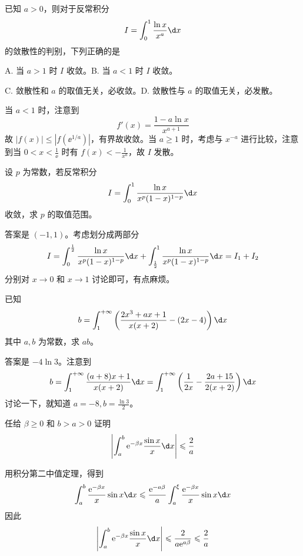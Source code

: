 \begin{problem}[000027]
已知 $a > 0$，则对于反常积分
\[ I = \int_{0}^{1} \frac{\ln x}{x^a} \d x \]
的敛散性的判别，下列正确的是

A. 当 $a > 1$ 时 $I$ 收敛。B. 当 $a < 1$ 时 $I$ 收敛。

C. 敛散性和 $a$ 的取值无关，必收敛。D. 敛散性与 $a$ 的取值无关，必发散。
\end{problem}
\begin{solution}
	当 $a < 1$ 时，注意到
	\[ f'(x) = \frac{1 - a \ln x}{x^{a+1}} \]
	故 $|f(x)| \leqslant |f(\ee^{1/a})|$，有界故收敛。当 $a \geqslant 1$ 时，考虑与 $x^{-a}$ 进行比较，注意到当 $0 < x < \frac{1}{\ee}$ 时有 $f(x) < -\frac{1}{x^a}$，故 $I$ 发散。
\end{solution}

\begin{problem}[000028]
设 $p$ 为常数，若反常积分
\[ I = \int_{0}^{1} \frac{\ln x}{x^p(1-x)^{1-p}} \d x \]
收敛，求 $p$ 的取值范围。
\end{problem}
\begin{solution}
	答案是 $(-1,1)$。考虑划分成两部分
	\[ I = \int_{0}^{\frac{1}{2}} \frac{\ln x}{x^p(1-x)^{1-p}} \d x + \int_{\frac{1}{2}}^{1} \frac{\ln x}{x^p(1-x)^{1-p}} \d x = I_1 + I_2 \]
	分别对 $x \to 0$ 和 $x \to 1$ 讨论即可，有点麻烦。
\end{solution}

\begin{problem}[000029]
已知
\[ b = \int_{1}^{+\infty} \left(\frac{2x^3 + ax + 1}{x(x+2)} - (2x-4)\right) \d x \]
其中 $a,b$ 为常数，求 $ab$。
\end{problem}
\begin{solution}
	答案是 $-4 \ln 3$。注意到
	\[ b = \int_{1}^{+\infty} \frac{(a+8)x+1}{x(x+2)} \d x= \int_{1}^{+\infty} \left(\frac{1}{2x} - \frac{2a+15}{2(x+2)}\right) \d x \]
	讨论一下，就知道 $a = -8, b = \frac{\ln 3}{2} $。
\end{solution}

\begin{problem}[000044]
任给 $\beta \geqslant 0$ 和 $b > a > 0$ 证明
\[ \left| \int_{a}^{b} \ee^{-\beta x} \frac{\sin x}{x} \d x \right| \leqslant \frac{2}{a} \]
\end{problem}

\begin{solution}
	用积分第二中值定理，得到
	\[ \int_{a}^{b} \frac{\ee^{-\beta x}}{x} \sin x \d x \leqslant \frac{\ee^{-a \beta}}{a} \int_{a}^{\xi} \frac{\ee^{-\beta x}}{x} \sin x \d x \]
	因此
	\[ \left| \int_{a}^{b} \ee^{-\beta x} \frac{\sin x}{x} \d x \right| \leqslant \frac{2}{a \ee^{a \beta}} \leqslant \frac{2}{a} \]
\end{solution}

